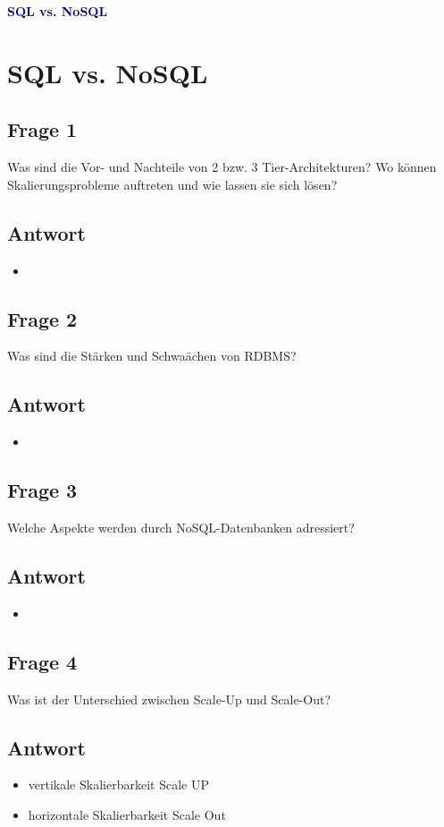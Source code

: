 \textbf{\textcolor{darkblue}{ SQL vs. NoSQL}}~

\section*{SQL vs. NoSQL}
\subsection*{Frage 1}
Was sind die Vor- und Nachteile von 2 bzw. 3 Tier-Architekturen? Wo können Skalierungsprobleme auftreten und wie lassen sie sich lösen?
\subsection*{Antwort}
\begin{itemize}
	\item 
\end{itemize}

\subsection*{Frage 2}
Was sind die Stärken und Schwaächen von RDBMS?
\subsection*{Antwort}
\begin{itemize}
	\item 
\end{itemize}

\subsection*{Frage 3}
Welche Aspekte werden durch NoSQL-Datenbanken adressiert?
\subsection*{Antwort}
\begin{itemize}
	\item 
\end{itemize}

\subsection*{Frage 4}
Was ist der Unterschied zwischen Scale-Up und Scale-Out?
\subsection*{Antwort}
\begin{itemize}
	\item vertikale Skalierbarkeit Scale UP
	\item horizontale Skalierbarkeit Scale Out
\end{itemize}

